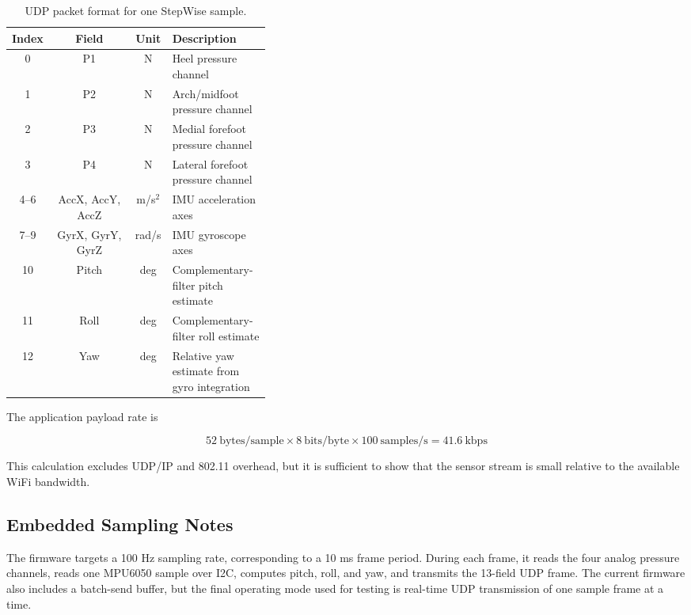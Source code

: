 \begin{table}[h]
\centering
\caption{UDP packet format for one StepWise sample.}
\label{tab:udp_packet_format}
\begin{tabular}{|c|c|c|p{0.38\linewidth}|}
\hline
\textbf{Index} & \textbf{Field} & \textbf{Unit} & \textbf{Description} \\
\hline
0 & P1 & N & Heel pressure channel \\
1 & P2 & N & Arch/midfoot pressure channel \\
2 & P3 & N & Medial forefoot pressure channel \\
3 & P4 & N & Lateral forefoot pressure channel \\
4--6 & AccX, AccY, AccZ & m/s$^2$ & IMU acceleration axes \\
7--9 & GyrX, GyrY, GyrZ & rad/s & IMU gyroscope axes \\
10 & Pitch & deg & Complementary-filter pitch estimate \\
11 & Roll & deg & Complementary-filter roll estimate \\
12 & Yaw & deg & Relative yaw estimate from gyro integration \\
\hline
\end{tabular}
\end{table}

The application payload rate is

\begin{equation}
52~\mathrm{bytes/sample}\times 8~\mathrm{bits/byte}\times 100~\mathrm{samples/s}
=41.6~\mathrm{kbps}
\label{eq:app_payload_appendix}
\end{equation}

This calculation excludes UDP/IP and 802.11 overhead, but it is sufficient to show that the sensor stream is small relative to the available WiFi bandwidth.

\subsection{Embedded Sampling Notes}
\label{app:sampling_notes}

The firmware targets a 100 Hz sampling rate, corresponding to a 10 ms frame period. During each frame, it reads the four analog pressure channels, reads one MPU6050 sample over I2C, computes pitch, roll, and yaw, and transmits the 13-field UDP frame. The current firmware also includes a batch-send buffer, but the final operating mode used for testing is real-time UDP transmission of one sample frame at a time.

